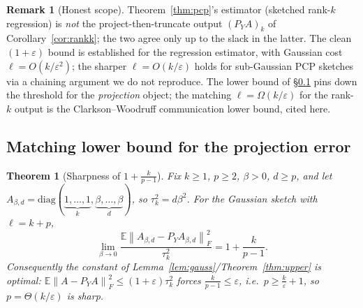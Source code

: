 \documentclass{amsart}
\newtheorem{theorem}{Theorem}
\theoremstyle{definition}
\newtheorem{remark}{Remark}
\newcommand{\Frob}[1]{\left\lVert #1\right\rVert_F}
\newcommand{\E}{\mathbb{E}}
\begin{document}
\begin{remark}[Honest scope]\label{rem:scope}
Theorem~\ref{thm:pcp}'s estimator (sketched rank-$k$ regression) is \emph{not}
the project-then-truncate output $(P_YA)_k$ of Corollary~\ref{cor:rankk}; the
two agree only up to the slack in the latter. The clean $(1+\varepsilon)$ bound
is established for the regression estimator, with Gaussian cost
$\ell=O(k/\varepsilon^2)$; the sharper $\ell=O(k/\varepsilon)$ holds for
sub-Gaussian PCP sketches via a chaining argument we do not reproduce. The
lower bound of \S\ref{sec:lower} pins down the threshold for the
\emph{projection} object; the matching $\ell=\Omega(k/\varepsilon)$ for the
rank-$k$ output is the Clarkson--Woodruff communication lower bound, cited here.
\end{remark}

\subsection{Matching lower bound for the projection error}\label{sec:lower}

\begin{theorem}[Sharpness of $1+\tfrac{k}{p-1}$]\label{thm:lower}
Fix $k\ge1$, $p\ge2$, $\beta>0$, $d\ge p$, and let
$A_{\beta,d}=\mathrm{diag}(\underbrace{1,\dots,1}_{k},\underbrace{\beta,\dots,\beta}_{d})$,
so $\tau_k^2=d\beta^2$. For the Gaussian sketch with $\ell=k+p$,
\begin{equation}\label{eq:limit}
\lim_{\beta\to0}\frac{\E\Frob{A_{\beta,d}-P_YA_{\beta,d}}^2}{\tau_k^2}
=1+\frac{k}{p-1}.
\end{equation}
Consequently the constant of Lemma~\ref{lem:gauss}/Theorem~\ref{thm:upper} is
optimal: $\E\Frob{A-P_YA}^2\le(1+\varepsilon)\tau_k^2$ forces
$\frac{k}{p-1}\le\varepsilon$, i.e.\ $p\ge\frac k\varepsilon+1$, so
$p=\Theta(k/\varepsilon)$ is sharp.
\end{theorem}
\end{document}
